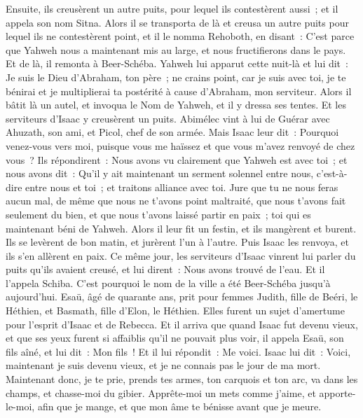 \begin{multicols}{2}
Ensuite, ils creusèrent un autre puits, pour lequel ils contestèrent aussi~; et il appela son nom Sitna.
Alors il se transporta de là et creusa un autre puits pour lequel ils ne contestèrent point, et il le nomma Rehoboth, en disant~: C'est parce que Yahweh nous a maintenant mis au large, et nous fructifierons dans le pays.
Et de là, il remonta à Beer-Schéba.
Yahweh lui apparut cette nuit-là et lui dit~: Je suis le Dieu d'Abraham, ton père~; ne crains point, car je suis avec toi, je te bénirai et je multiplierai ta postérité à cause d'Abraham, mon serviteur.
Alors il bâtit là un autel, et invoqua le Nom de Yahweh, et il y dressa ses tentes. Et les serviteurs d'Isaac y creusèrent un puits.
Abimélec vint à lui de Guérar avec Ahuzath, son ami, et Picol, chef de son armée.
Mais Isaac leur dit~: Pourquoi venez-vous vers moi, puisque vous me haïssez et que vous m'avez renvoyé de chez vous~?
Ils répondirent~: Nous avons vu clairement que Yahweh est avec toi~; et nous avons dit~: Qu'il y ait maintenant un serment solennel entre nous, c'est-à-dire entre nous et toi~; et traitons alliance avec toi.
Jure que tu ne nous feras aucun mal, de même que nous ne t'avons point maltraité, que nous t'avons fait seulement du bien, et que nous t'avons laissé partir en paix~; toi qui es maintenant béni de Yahweh.
Alors il leur fit un festin, et ils mangèrent et burent.
Ils se levèrent de bon matin, et jurèrent l'un à l'autre. Puis Isaac les renvoya, et ils s'en allèrent en paix.
Ce même jour, les serviteurs d'Isaac vinrent lui parler du puits qu'ils avaient creusé, et lui dirent~: Nous avons trouvé de l'eau.
Et il l'appela Schiba. C'est pourquoi le nom de la ville a été Beer-Schéba jusqu'à aujourd'hui.
Esaü, âgé de quarante ans, prit pour femmes Judith, fille de Beéri, le Héthien, et Basmath, fille d'Elon, le Héthien.
Elles furent un sujet d'amertume pour l'esprit d'Isaac et de Rebecca.
\VerseOne{}Et il arriva que quand Isaac fut devenu vieux, et que ses yeux furent si affaiblis qu'il ne pouvait plus voir, il appela Esaü, son fils aîné, et lui dit~: Mon fils~! Et il lui répondit~: Me voici.
Isaac lui dit~: Voici, maintenant je suis devenu vieux, et je ne connais pas le jour de ma mort.
Maintenant donc, je te prie, prends tes armes, ton carquois et ton arc, va dans les champs, et chasse-moi du gibier.
Apprête-moi un mets comme j'aime, et apporte-le-moi, afin que je mange, et que mon âme te bénisse avant que je meure.

\end{multicols}
